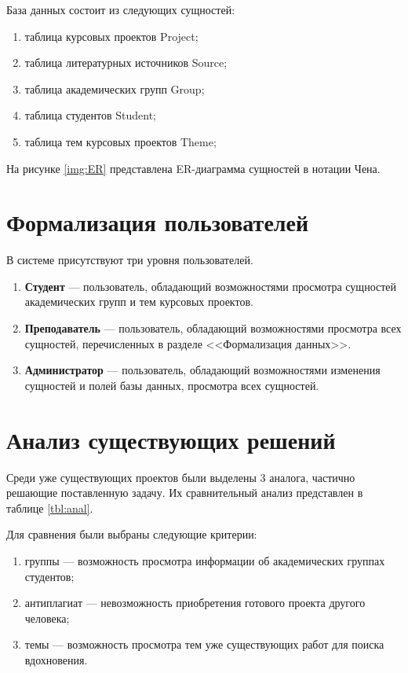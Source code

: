 База данных состоит из следующих сущностей:
\begin{enumerate}
	\item таблица курсовых проектов Project;
	\item таблица литературных источников Source;
	\item таблица академических групп Group;
	\item таблица студентов Student;
	\item таблица тем курсовых проектов Theme;
\end{enumerate}

На рисунке \ref{img:ER} представлена ER-диаграмма сущностей в нотации Чена.


\section{Формализация пользователей}

В системе присутствуют три уровня пользователей.

\begin{enumerate}
	\item \textbf{Студент} --- пользователь, обладающий возможностями просмотра сущностей академических групп и тем курсовых проектов.
	\item \textbf{Преподаватель} --- пользователь, обладающий возможностями просмотра всех сущностей, перечисленных в разделе <<Формализация данных>>.
	\item \textbf{Администратор} --- пользователь, обладающий возможностями изменения сущностей и полей базы данных, просмотра всех сущностей.
\end{enumerate}

\section{Анализ существующих решений}
Среди уже существующих проектов были выделены 3 аналога, частично решающие поставленную задачу. Их сравнительный анализ представлен в таблице \ref{tbl:anal}.

Для сравнения были выбраны следующие критерии:
\begin{enumerate}
	\item группы --- возможность просмотра информации об академических группах студентов;
	\item антиплагиат --- невозможность приобретения готового проекта другого человека;
	\item темы --- возможность просмотра тем уже существующих работ для поиска вдохновения.
\end{enumerate}

